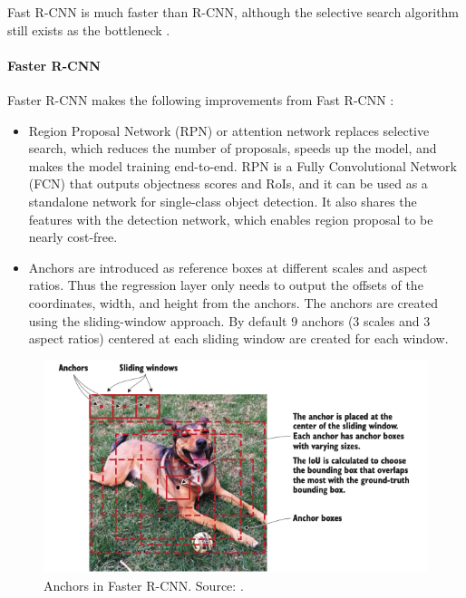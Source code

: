 \documentclass[a4paper, 11pt, oneside]{article}
\begin{document}
Fast R-CNN is much faster than R-CNN, although the selective search algorithm still exists as the bottleneck
\cite{elgendy2020deep, girshick2015fast, ren2015faster}.

\paragraph{Faster R-CNN}

Faster R-CNN makes the following improvements from Fast R-CNN \cite{elgendy2020deep, ren2015faster}:

\begin{itemize}
  \item Region Proposal Network (RPN) or attention network replaces selective search, which reduces the number of
  proposals, speeds up the model, and makes the model training end-to-end. RPN is a Fully Convolutional Network (FCN)
  \cite{long2015fully} that outputs objectness scores and RoIs, and it can be used as a standalone network for
  single-class object detection. It also shares the features with the detection network, which enables region proposal
  to be nearly cost-free.
  \item Anchors are introduced as reference boxes at different scales and aspect ratios. Thus the regression layer
  only needs to output the offsets of the coordinates, width, and height from the anchors. The anchors are created using
  the sliding-window approach. By default 9 anchors (3 scales and 3 aspect ratios) centered at each sliding window are
  created for each window.
\end{itemize}

\begin{figure}[ht]
  \begin{center}
    \includegraphics[width=.8\textwidth]{anchors.png}
  \end{center}
  \caption{Anchors in Faster R-CNN. Source: \cite{elgendy2020deep}.}
\end{figure}
\end{document}

